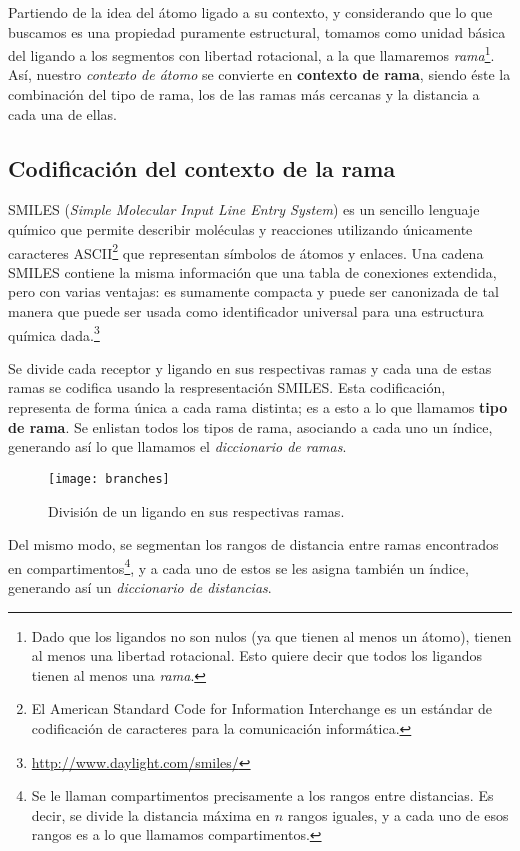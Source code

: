Partiendo de la idea del átomo ligado a su contexto, y considerando
que lo que buscamos es una propiedad puramente estructural, tomamos
como unidad básica del ligando a los segmentos con libertad
rotacional, a la que llamaremos \textit{rama}\footnote{Dado que los
ligandos no son nulos (ya que tienen al menos un átomo), tienen al
menos una libertad rotacional. Esto quiere decir que todos los
ligandos tienen al menos una \textit{rama}.}. Así, nuestro
\textit{contexto de átomo} se convierte en \textbf{contexto de rama},
siendo éste la combinación del tipo de rama, los de las ramas más
cercanas y la distancia a cada una de ellas.

\subsection{Codificación del contexto de la rama}
SMILES (\textit{Simple Molecular Input Line Entry System}) es un
sencillo lenguaje químico que permite describir moléculas y reacciones
utilizando únicamente caracteres ASCII\footnote{El American Standard
  Code for Information Interchange es un estándar de codificación de
  caracteres para la comunicación informática.} que representan
símbolos de átomos y enlaces. Una cadena SMILES contiene la misma
información que una tabla de conexiones extendida, pero con varias
ventajas: es sumamente compacta y puede ser canonizada de tal manera
que puede ser usada como identificador universal para una estructura
química dada.\footnote{\url{http://www.daylight.com/smiles/}}

Se divide cada receptor y ligando en sus respectivas ramas y cada una
de estas ramas se codifica usando la respresentación SMILES. Esta
codificación, representa de forma única a cada rama distinta; es a
esto a lo que llamamos \textbf{tipo de rama}. Se enlistan todos los
tipos de rama, asociando a cada uno un índice, generando así lo que
llamamos el \textit{diccionario de ramas}.

\begin{figure}[H]
  \texttt{[image: branches]} \centering
  \caption{División de un ligando en sus respectivas ramas.}
\end{figure}

Del mismo modo, se segmentan los rangos de distancia entre ramas
encontrados en compartimentos\footnote{Se le llaman compartimentos
precisamente a los rangos entre distancias. Es decir, se divide la
distancia máxima en $n$ rangos iguales, y a cada uno de esos rangos es
a lo que llamamos compartimentos.}, y a cada uno de estos se les
asigna también un índice, generando así un \textit{diccionario de
  distancias}.

